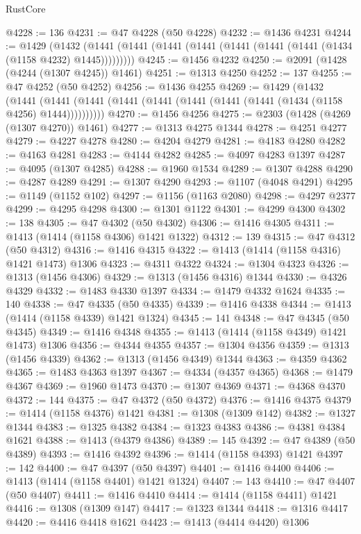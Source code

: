 \begin{lexlean}{RustCore}
\begin{coremodule}
@4228 := 136
@4231 := @47 @4228 (@50 @4228)
@4232 := @1436 @4231
@4244 := @1429
    (@1432 (@1441 (@1441 (@1441 (@1441 (@1441 (@1441 (@1441 (@1434 (@1158 @4232) @1445)))))))))
@4245 := @1456 @4232
@4250 := @2091 (@1428 (@4244 (@1307 @4245)) @1461)
@4251 := @1313 @4250
@4252 := 137
@4255 := @47 @4252 (@50 @4252)
@4256 := @1436 @4255
@4269 := @1429
    (@1432
      (@1441 (@1441 (@1441 (@1441 (@1441 (@1441 (@1441 (@1441 (@1434 (@1158 @4256) @1444))))))))))
@4270 := @1456 @4256
@4275 := @2303 (@1428 (@4269 (@1307 @4270)) @1461)
@4277 := @1313 @4275 @1344
@4278 := @4251 @4277
@4279 := @4227 @4278
@4280 := @4204 @4279
@4281 := @4183 @4280
@4282 := @4163 @4281
@4283 := @4144 @4282
@4285 := @4097 @4283 @1397
@4287 := @4095 (@1307 @4285)
@4288 := @1960 @1534
@4289 := @1307 @4288
@4290 := @4287 @4289
@4291 := @1307 @4290
@4293 := @1107 (@4048 @4291)
@4295 := @1149 (@1152 @102)
@4297 := @1156 (@1163 @2080)
@4298 := @4297 @2377
@4299 := @4295 @4298
@4300 := @1301 @1122
@4301 := @4299 @4300
@4302 := 138
@4305 := @47 @4302 (@50 @4302)
@4306 := @1416 @4305
@4311 := @1413 (@1414 (@1158 @4306) @1421 @1322)
@4312 := 139
@4315 := @47 @4312 (@50 @4312)
@4316 := @1416 @4315
@4322 := @1413 (@1414 (@1158 @4316) @1421 @1473) @1306
@4323 := @4311 @4322
@4324 := @1304 @4323
@4326 := @1313 (@1456 @4306)
@4329 := @1313 (@1456 @4316) @1344
@4330 := @4326 @4329
@4332 := @1483 @4330 @1397
@4334 := @1479 @4332 @1624
@4335 := 140
@4338 := @47 @4335 (@50 @4335)
@4339 := @1416 @4338
@4344 := @1413 (@1414 (@1158 @4339) @1421 @1324)
@4345 := 141
@4348 := @47 @4345 (@50 @4345)
@4349 := @1416 @4348
@4355 := @1413 (@1414 (@1158 @4349) @1421 @1473) @1306
@4356 := @4344 @4355
@4357 := @1304 @4356
@4359 := @1313 (@1456 @4339)
@4362 := @1313 (@1456 @4349) @1344
@4363 := @4359 @4362
@4365 := @1483 @4363 @1397
@4367 := @4334 (@4357 @4365)
@4368 := @1479 @4367
@4369 := @1960 @1473
@4370 := @1307 @4369
@4371 := @4368 @4370
@4372 := 144
@4375 := @47 @4372 (@50 @4372)
@4376 := @1416 @4375
@4379 := @1414 (@1158 @4376) @1421
@4381 := @1308 (@1309 @142)
@4382 := @1327 @1344
@4383 := @1325 @4382
@4384 := @1323 @4383
@4386 := @4381 @4384 @1621
@4388 := @1413 (@4379 @4386)
@4389 := 145
@4392 := @47 @4389 (@50 @4389)
@4393 := @1416 @4392
@4396 := @1414 (@1158 @4393) @1421
@4397 := 142
@4400 := @47 @4397 (@50 @4397)
@4401 := @1416 @4400
@4406 := @1413 (@1414 (@1158 @4401) @1421 @1324)
@4407 := 143
@4410 := @47 @4407 (@50 @4407)
@4411 := @1416 @4410
@4414 := @1414 (@1158 @4411) @1421
@4416 := @1308 (@1309 @147)
@4417 := @1323 @1344
@4418 := @1316 @4417
@4420 := @4416 @4418 @1621
@4423 := @1413 (@4414 @4420) @1306

\end{coremodule}
\end{lexlean}
